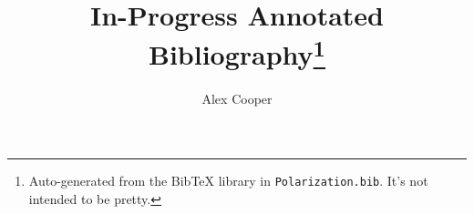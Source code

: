 \documentclass[a4paper,10pt]{article}
\title{In-Progress Annotated Bibliography\thanks{
Auto-generated from the BibTeX library in {\tt Polarization.bib}.
It's not intended to be pretty.
}}
\author{Alex Cooper}
\begin{document}
\maketitle
\nocite{*}



\end{document}
